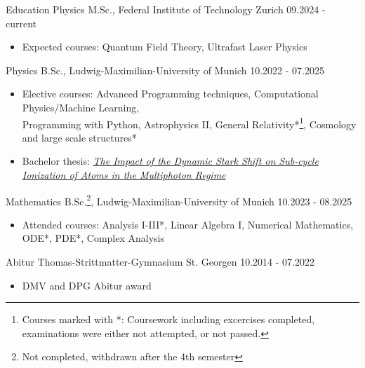 \documentclass{resume}
\begin{document}
\begin{rSection}{Education}
    Physics M.Sc., Federal Institute of Technology Zurich \hfill 09.2024 - current
    \begin{itemize}\footnotesize
        \item Expected courses: Quantum Field Theory, Ultrafast Laser Physics
    \end{itemize}

    Physics B.Sc., Ludwig-Maximilian-University of Munich \hfill 10.2022 - 07.2025
    \begin{itemize}\footnotesize
        \item Elective courses: Advanced Programming techniques, Computational Physics/Machine Learning,\\Programming with Python, Astrophysics II, General Relativity*\footnote{Courses marked with *: Coursework including excercises completed, examinations were either not attempted, or not passed.}, Cosmology and large scale structures*
        \item Bachelor thesis: \textit{\href{https://doi.org/10.5281/zenodo.16223179}{The Impact of the Dynamic Stark Shift on Sub-cycle Ionization of Atoms in the Multiphoton Regime}}
    \end{itemize}

    Mathematics B.Sc.\footnote{Not completed, withdrawn after the 4th semester}, Ludwig-Maximilian-University of Munich \hfill 10.2023 - 08.2025
    \begin{itemize}\footnotesize
        \item Attended courses: Analysis I-III*, Linear Algebra I, Numerical Mathematics, \\ODE*, PDE*, Complex Analysis
    \end{itemize}

    Abitur Thomas-Strittmatter-Gymnasium St. Georgen \hfill 10.2014 - 07.2022
    \begin{itemize}\footnotesize
        \item DMV and DPG Abitur award
    \end{itemize}

\end{rSection}
\end{document}

